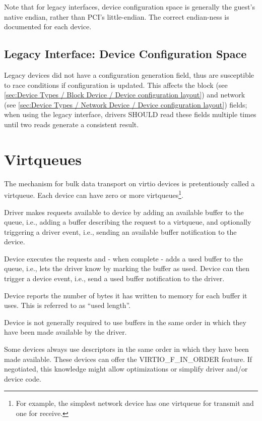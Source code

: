 Note that for legacy interfaces, device configuration space is generally the
guest's native endian, rather than PCI's little-endian.
The correct endian-ness is documented for each device.

\subsection{Legacy Interface: Device Configuration Space}\label{sec:Basic Facilities of a Virtio Device / Device Configuration Space / Legacy Interface: Device Configuration Space}

Legacy devices did not have a configuration generation field, thus are
susceptible to race conditions if configuration is updated.  This
affects the block  (see \ref{sec:Device Types /
Block Device / Device configuration layout}) and
network  (see \ref{sec:Device Types / Network Device /
Device configuration layout}) fields;
when using the legacy interface, drivers SHOULD
read these fields multiple times until two reads generate a consistent
result.

\section{Virtqueues}\label{sec:Basic Facilities of a Virtio Device / Virtqueues}

The mechanism for bulk data transport on virtio devices is
pretentiously called a virtqueue. Each device can have zero or more
virtqueues\footnote{For example, the simplest network device has one virtqueue for
transmit and one for receive.}.

Driver makes requests available to device by adding
an available buffer to the queue, i.e., adding a buffer
describing the request to a virtqueue, and optionally triggering
a driver event, i.e., sending an available buffer notification
to the device.

Device executes the requests and - when complete - adds
a used buffer to the queue, i.e., lets the driver
know by marking the buffer as used. Device can then trigger
a device event, i.e., send a used buffer notification to the driver.

Device reports the number of bytes it has written to memory for
each buffer it uses. This is referred to as ``used length''.

Device is not generally required to use buffers in
the same order in which they have been made available
by the driver.

Some devices always use descriptors in the same order in which
they have been made available. These devices can offer the
VIRTIO_F_IN_ORDER feature. If negotiated, this knowledge
might allow optimizations or simplify driver and/or device code.

